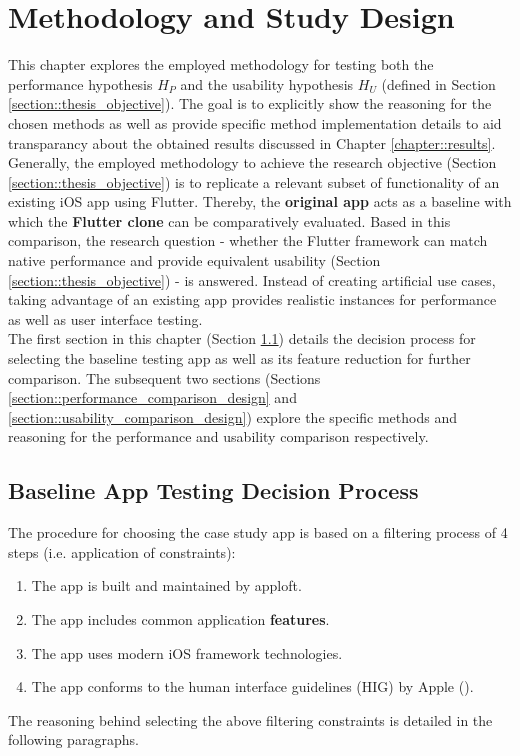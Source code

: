 \chapter{Methodology and Study Design}
This chapter explores the employed methodology for testing both the performance hypothesis $H_P$ and the usability hypothesis $H_U$ (defined in Section \ref{section::thesis_objective}). 
The goal is to explicitly show the reasoning for the chosen methods as well as provide specific method implementation details to aid transparancy about the obtained results discussed in Chapter \ref{chapter::results}.\\
Generally, the employed methodology to achieve the research objective (Section \ref{section::thesis_objective}) is to replicate a relevant subset of functionality of an existing iOS app using Flutter. Thereby, the \textbf{original app} acts as a baseline with which the \textbf{Flutter clone} 
can be comparatively evaluated. Based in this comparison, the research question - whether the Flutter framework can match native performance and provide equivalent usability (Section \ref{section::thesis_objective}) - is answered.
Instead of creating artificial use cases, taking advantage of an existing app provides realistic instances for performance as well as user interface testing.\\
The first section in this chapter (Section \ref{section::feature_selection}) details the decision process for selecting the baseline testing app as well as its feature reduction for further comparison. 
The subsequent two sections (Sections \ref{section::performance_comparison_design} and \ref{section::usability_comparison_design}) explore the specific methods and reasoning for the performance and 
usability comparison respectively.




\section{Baseline App Testing Decision Process} \label{section::feature_selection}
The procedure for choosing the case study app is based on a filtering process of 4 steps (i.e. application of constraints):
\begin{enumerate}
    \item The app is built and maintained by apploft. \label{item::constraint_one}
    \item The app includes common application \textbf{features}. \label{item::constraint_two}
    \item The app uses modern iOS framework technologies. \label{item::constraint_three}
    \item The app conforms to the human interface guidelines (HIG) by Apple (\cite{Apple2021a}). \label{item::constraint_four}
\end{enumerate}
The reasoning behind selecting the above filtering constraints is detailed in the following paragraphs.

